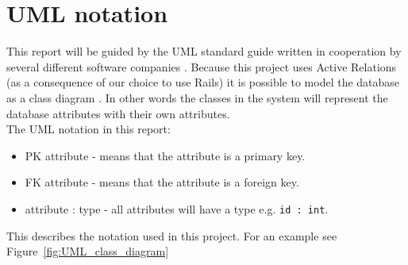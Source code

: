 \section{UML notation} \label{section:uml_notation}

This report will be guided by the UML standard guide written in cooperation by several different software companies \citep{UML_notation}.
Because this project uses Active Relations (as a consequence of our choice to use Rails) it is possible to model the database as a class diagram \citep{active_records}. 
In other words the classes in the system will represent the database attributes with their own attributes. \\

The UML notation in this report:
\begin{itemize}
	\item PK attribute - means that the attribute is a primary key.
	\item FK attribute - means that the attribute is a foreign key.
	\item attribute : type - all attributes will have a type e.g. \verb+id : int+.
\end{itemize}

This describes the notation used in this project. For an example see Figure~\ref{fig:UML_class_diagram}